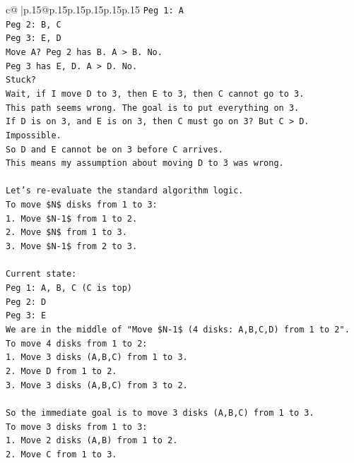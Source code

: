 \documentclass{article}
\begin{document}
{\begin{supertabular}{c@{$\;$}|p{.15\linewidth}@{}p{.15\linewidth}p{.15\linewidth}p{.15\linewidth}p{.15\linewidth}p{.15\linewidth}}
{{{\texttt{Peg 1: A} \\
\texttt{Peg 2: B, C} \\
\texttt{Peg 3: E, D} \\
\texttt{Move A? Peg 2 has B. A > B. No.} \\
\texttt{Peg 3 has E, D. A > D. No.} \\
\texttt{Stuck?} \\
\texttt{Wait, if I move D to 3, then E to 3, then C cannot go to 3.} \\
\texttt{This path seems wrong. The goal is to put everything on 3.} \\
\texttt{If D is on 3, and E is on 3, then C must go on 3? But C > D. Impossible.} \\
\texttt{So D and E cannot be on 3 before C arrives.} \\
\texttt{This means my assumption about moving D to 3 was wrong.} \\
\\ 
\texttt{Let's re{-}evaluate the standard algorithm logic.} \\
\texttt{To move \$N\$ disks from 1 to 3:} \\
\texttt{1. Move \$N{-}1\$ from 1 to 2.} \\
\texttt{2. Move \$N\$ from 1 to 3.} \\
\texttt{3. Move \$N{-}1\$ from 2 to 3.} \\
\\ 
\texttt{Current state:} \\
\texttt{Peg 1: A, B, C (C is top)} \\
\texttt{Peg 2: D} \\
\texttt{Peg 3: E} \\
\texttt{We are in the middle of "Move \$N{-}1\$ (4 disks: A,B,C,D) from 1 to 2".} \\
\texttt{To move 4 disks from 1 to 2:} \\
\texttt{1. Move 3 disks (A,B,C) from 1 to 3.} \\
\texttt{2. Move D from 1 to 2.} \\
\texttt{3. Move 3 disks (A,B,C) from 3 to 2.} \\
\\ 
\texttt{So the immediate goal is to move 3 disks (A,B,C) from 1 to 3.} \\
\texttt{To move 3 disks from 1 to 3:} \\
\texttt{1. Move 2 disks (A,B) from 1 to 2.} \\
\texttt{2. Move C from 1 to 3.} \\
}}}
\end{supertabular}}
\end{document}
